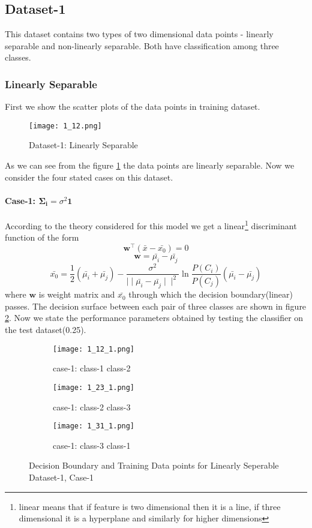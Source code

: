 \documentclass[a4paper]{article}
\begin{document}
\subsection{Dataset-1}
This dataset contains two types of two dimensional data points - linearly separable and non-linearly separable. Both have classification among three classes.
\subsubsection{Linearly Separable}
First we show the scatter plots of the data points in training dataset.
\begin{figure}[h!]
  \texttt{[image: 1\_12.png]}
  \caption{Dataset-1: Linearly Separable}
  \label{fig:Linearly Separable}
\end{figure}

As we can see from the figure \ref{fig:Linearly Separable} the data points are linearly separable. Now we consider the four stated cases on this dataset.
\newpage
\paragraph{Case-1: $\mathbf{\Sigma_{i}}=\sigma^{2}\mathbf{1}$}
According to the theory considered for this model we get a linear\footnote{linear means that if feature is two dimensional then it is a line, if three dimensional it is a hyperplane and similarly for higher dimensions} discriminant function of the form
\begin{equation}
\mathbf{w^{\intercal}}(\bar{x}-\bar{x_{0}})=0
\end{equation}
\[
\mathbf{w} = \bar{\mu_{i}}-\bar{\mu_{j}}
\]
\[
\bar{x_{0}} = \frac{1}{2}(\bar{\mu_{i}}+\bar{\mu_{j}})-\frac{\sigma^{2}}{\mid\mid \bar{\mu_{i}}-\bar{\mu_{j}}\mid\mid^{2}}\ln\frac{P(C_{i})}{P(C_{j})}(\bar{\mu_{i}}-\bar{\mu_{j}})
\]
where $\mathbf{w}$ is weight matrix and $\bar{x_{0}}$ through which the decision boundary(linear) passes. The decision surface between each pair of three classes are shown in figure \ref{fig:1_1}. Now we state the performance parameters obtained by testing the classifier on the test dataset(0.25).  

\begin{figure}[h!]
  \centering
  \begin{subfigure}[b]{0.4\linewidth}
    \texttt{[image: 1\_12\_1.png]}
     \caption{case-1: class-1 class-2}
  \end{subfigure}
  \begin{subfigure}[b]{0.4\linewidth}
    \texttt{[image: 1\_23\_1.png]}
    \caption{case-1: class-2 class-3}
  \end{subfigure}
  \begin{subfigure}[b]{0.4\linewidth}
    \texttt{[image: 1\_31\_1.png]}
    \caption{case-1: class-3 class-1}
  \end{subfigure}
  \caption{Decision Boundary and Training Data points for Linearly Seperable Dataset-1, Case-1}
  \label{fig:1_1}
\end{figure}
\end{document}
